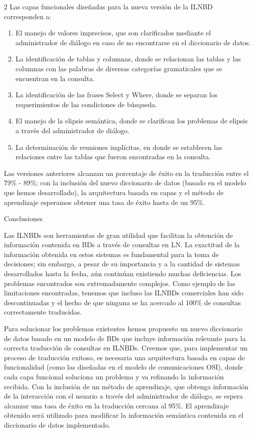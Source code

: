 \documentclass[letterpaper,10pt,final,hyphenatedtitles]{papertexKS}
\begin{document}
\begin{news}{2}
Las capas funcionales diseñadas para la nueva versión de la ILNBD corresponden a:
\begin{enumerate}
\item El manejo de valores imprecisos, que son clarificados mediante el administrador  de diálogo en caso de no encontrarse en el diccionario de datos.
\item La identificación de tablas y columnas, donde se relacionan las tablas y las columnas con las palabras de diversas categorías gramaticales que se encuentran en la consulta.
\item La identificación de las frases Select y Where, donde se separan los requerimientos de las condiciones de búsqueda.
\item El manejo de la elipsis semántica, donde se clarifican los problemas de elipsis a través del administrador de diálogo.
\item La determinación de reuniones implícitas, en donde se establecen las relaciones entre las tablas que fueron encontradas en la consulta.
\end{enumerate}

Las versiones anteriores alcanzan un porcentaje de éxito en la traducción entre el 79\%  - 89\%; con la inclusión del nuevo diccionario de datos (basado en el modelo que hemos desarrollado), la arquitectura basada en capas y el método de aprendizaje esperamos obtener una tasa de éxito hasta de un 95\%.
	
\noindent\textcolor{color}{\Large{Conclusiones}}

Las ILNBDs son herramientas de gran utilidad que facilitan la obtención de información contenida en BDs a través de consultas en LN.  La exactitud de la información obtenida en estos sistemas es fundamental para la toma de decisiones; sin embargo, a pesar de su importancia y a la cantidad de sistemas desarrollados hasta la fecha, aún continúan existiendo muchas deficiencias. Los problemas encontrados son extremadamente complejos. Como ejemplo de las limitaciones encontradas, tenemos que incluso las ILNBDs comerciales han sido descontinuadas y el hecho de que ninguna se ha acercado al 100\% de consultas correctamente traducidas.
	 
Para solucionar los problemas existentes  hemos propuesto un nuevo diccionario de datos basado en un modelo de BDs que incluye información relevante para la correcta traducción de consultas en ILNBDs. Creemos que, para implementar un proceso de traducción exitoso, es necesaria una arquitectura basada en capas de funcionalidad (como las diseñadas en el modelo de comunicaciones OSI), donde cada capa funcional soluciona un problema y va refinando la información recibida. Con la inclusión de un método de aprendizaje, que obtenga información de la interacción con el usuario a través del administrador de diálogo, se espera alcanzar una tasa de éxito en la traducción cercana al 95\%. El aprendizaje obtenido será utilizado para modificar la información semántica contenida en el diccionario de datos implementado.


\end{news}
\end{document}

